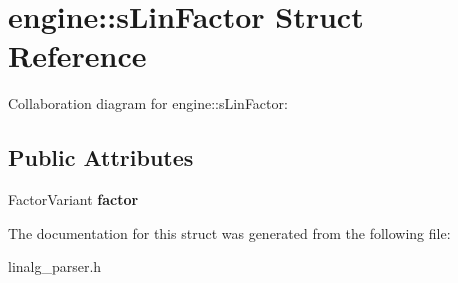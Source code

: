 \hypertarget{structengine_1_1sLinFactor}{\section{engine\-:\-:s\-Lin\-Factor Struct Reference}
\label{structengine_1_1sLinFactor}
}


Collaboration diagram for engine\-:\-:s\-Lin\-Factor\-:
\subsection*{Public Attributes}
\begin{DoxyCompactItemize}
\item 
\hypertarget{structengine_1_1sLinFactor_a1104c8cd6e2f08a00e717a2b3dc4d4c4}{Factor\-Variant {\bfseries factor}}\label{structengine_1_1sLinFactor_a1104c8cd6e2f08a00e717a2b3dc4d4c4}

\end{DoxyCompactItemize}


The documentation for this struct was generated from the following file\-:\begin{DoxyCompactItemize}
\item 
linalg\-\_\-parser.\-h\end{DoxyCompactItemize}

